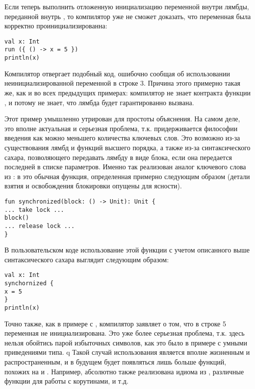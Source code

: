 Если теперь выполнить отложенную инициализацию переменной внутри лямбды, переданной внутрь , то компилятор уже не сможет доказать, что переменная была корректно проинициализированна:

\begin{verbatim}
val x: Int
run ({ () -> x = 5 })
println(x)
\end{verbatim}

Компилятор отвергает подобный код, ошибочно сообщая об использовании неинициализированной переменной в строке 3. Причина этого примерно такая же, как и во всех предыдущих примерах: компилятор не знает контракта функции , и потому не знает, что лямбда  будет гарантированно вызвана.

Этот пример умышленно утрирован для простоты объяснения. На самом деле, это вполне актуальная и серьезная проблема, т.к.  придерживается философии введения как можно меньшего количества ключевых слов. Это возможно из-за существования лямбд и функций высшего порядка, а также из-за синтаксического сахара, позволяющего передавать лямбду в виде блока, если она передается последней в списке параметров. Именно так реализован аналог ключевого слова  из : в  это обычная функция, определенная примерно следующим образом (детали взятия и освобождения блокировки опущены для ясности).

\begin{verbatim}
fun synchronized(block: () -> Unit): Unit {
... take lock ...
block()
... release lock ...
}
\end{verbatim}

В пользовательском коде использование этой функции с учетом описанного выше синтаксического сахара выглядит следующим образом:

\begin{verbatim}
val x: Int
synchornized {
x = 5
}
println(x)
\end{verbatim}

Точно также, как в примере с , компилятор заявляет о том, что в строке 5 переменная  не инициализирована. Это уже более серьезная проблема, т.к. здесь нельзя обойтись парой избыточных символов, как это было в примере с умными приведениями типа. 
q
Такой случай использования является вполне жизненным и распространенным, и в будущем будет появляться лишь больше функций, похожих на  и . Например, абсолютно также реализована идиома  из , различные функции для работы с корутинами, и т.д.

